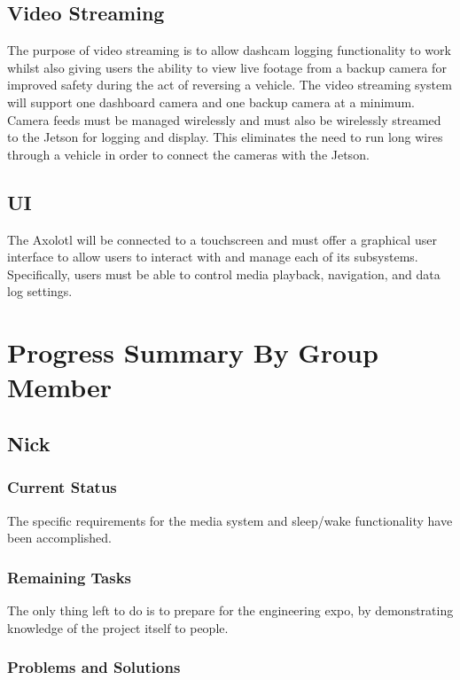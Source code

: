 \documentclass[onecolumn, draftclsnofoot, 10pt, compsoc]{IEEEtran}
\begin{document}
\subsection{Video Streaming}
The purpose of video streaming is to allow dashcam logging functionality to work whilst also giving users the ability to view live footage from a backup camera for improved safety during the act of reversing a vehicle. The video streaming system will support one dashboard camera and one backup camera at a minimum. Camera feeds must be managed wirelessly and must also be wirelessly streamed to the Jetson for logging and display. This eliminates the need to run long wires through a vehicle in order to connect the cameras with the Jetson.

\subsection{UI}
The Axolotl will be connected to a touchscreen and must offer a graphical user interface to allow users to interact with and manage each of its subsystems. Specifically, users must be able to control media playback, navigation, and data log settings.

\newpage
\section{Progress Summary By Group Member}

\subsection{Nick}
\subsubsection{Current Status}
The specific requirements for the media system and sleep/wake functionality have been accomplished. 

\subsubsection{Remaining Tasks}
The only thing left to do is to prepare for the engineering expo, by demonstrating knowledge of the project itself to people.

\subsubsection{Problems and Solutions}
\end{document}
